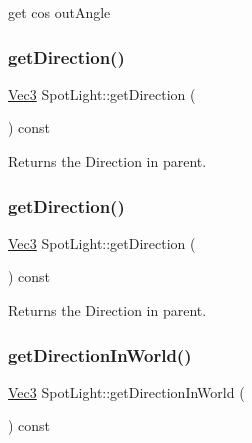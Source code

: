 get cos out\+Angle \mbox{\label{classSpotLight_a1a42e04a111bd83d52ef4dbdfb58604a}} 
\subsubsection{\texorpdfstring{get\+Direction()}{getDirection()}\hspace{0.1cm}{\footnotesize\ttfamily [1/2]}}
{\footnotesize\ttfamily \hyperlink{classVec3}{Vec3} Spot\+Light\+::get\+Direction (\begin{DoxyParamCaption}{ }\end{DoxyParamCaption}) const}

Returns the Direction in parent. \mbox{\label{classSpotLight_a1a42e04a111bd83d52ef4dbdfb58604a}} 
\subsubsection{\texorpdfstring{get\+Direction()}{getDirection()}\hspace{0.1cm}{\footnotesize\ttfamily [2/2]}}
{\footnotesize\ttfamily \hyperlink{classVec3}{Vec3} Spot\+Light\+::get\+Direction (\begin{DoxyParamCaption}{ }\end{DoxyParamCaption}) const}

Returns the Direction in parent. \mbox{\label{classSpotLight_a23a7a4f9925c546fdbf26f48f07ecd9a}} 
\subsubsection{\texorpdfstring{get\+Direction\+In\+World()}{getDirectionInWorld()}\hspace{0.1cm}{\footnotesize\ttfamily [1/2]}}
{\footnotesize\ttfamily \hyperlink{classVec3}{Vec3} Spot\+Light\+::get\+Direction\+In\+World (\begin{DoxyParamCaption}{ }\end{DoxyParamCaption}) const}

